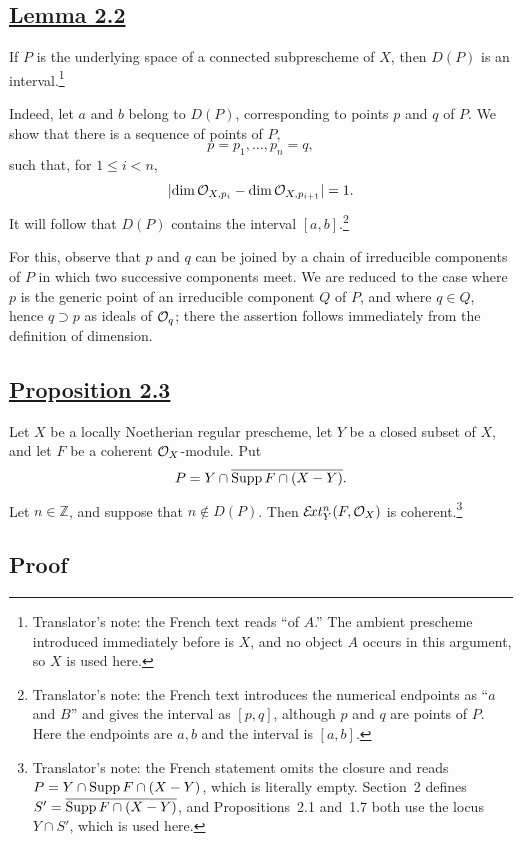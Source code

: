 \subsection*{\hyperref[VII.2.2]{Lemma 2.2}}

If $P$ is the underlying space of a connected subprescheme of $X$, then
$D(P)$ is an interval.\footnote{Translator's note: the French text reads
``of $A$.'' The ambient prescheme introduced immediately before is $X$, and
no object $A$ occurs in this argument, so $X$ is used here.}

Indeed, let $a$ and $b$ belong to $D(P)$, corresponding to points $p$ and $q$
of $P$. We show that there is a sequence of points of $P$,
\[
  p=p_1,\ldots,p_n=q,
\]
such that, for $1\leq i<n$,
\[
  \lvert\dim\mathcal O_{X,p_i}-\dim\mathcal O_{X,p_{i+1}}\rvert=1.
\]
It will follow that $D(P)$ contains the interval $[a,b]$.\footnote{Translator's note: the French
text introduces the numerical endpoints as ``$a$ and $B$''
and gives the interval as $[p,q]$, although $p$ and $q$ are points of $P$.
Here the endpoints are $a,b$ and the interval is $[a,b]$.}

For this, observe that $p$ and $q$ can be joined by a chain of irreducible
components of $P$ in which two successive components meet. We are reduced to
the case where $p$ is the generic point of an irreducible component $Q$ of
$P$, and where $q\in Q$, hence $q\supset p$ as ideals of $\mathcal O_q$; there the
assertion follows immediately from the definition of dimension.

\clearpage
\subsection*{\hyperref[VII.2.3]{Proposition 2.3}}

Let $X$ be a locally Noetherian regular prescheme, let $Y$ be a closed subset
of $X$, and let $F$ be a coherent $\mathcal O_X$-module. Put
\[
  P=Y\cap\overline{\operatorname{Supp} F\cap(X-Y)}.
\]
Let $n\in\mathbb Z$, and suppose that $n\notin D(P)$. Then
$\mathcal E\!xt_Y^n(F,\mathcal O_X)$ is coherent.\footnote{Translator's note: the French
statement omits the closure and reads
$P=Y\cap\operatorname{Supp} F\cap(X-Y)$, which is literally empty. Section~2 defines
$S'=\overline{\operatorname{Supp} F\cap(X-Y)}$, and Propositions~2.1 and~1.7 both use the
locus $Y\cap S'$, which is used here.}

\subsection*{Proof}

